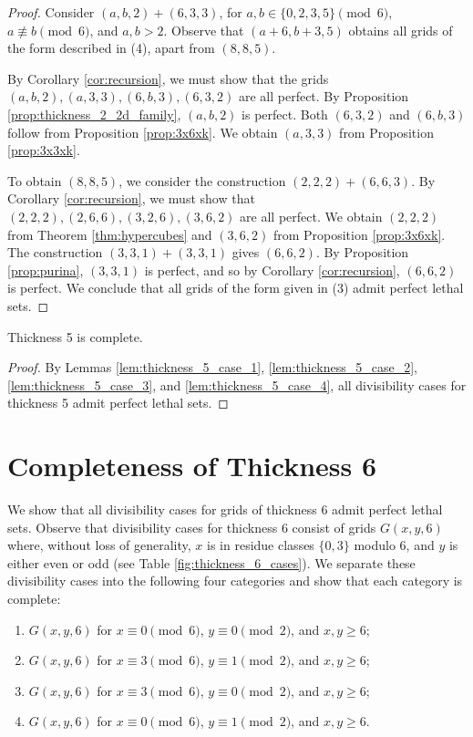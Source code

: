 \begin{proof}
Consider $(a,b,2) + (6,3,3)$, for $a,b \in \{0,2,3,5\} \pmod 6$, $a \not\equiv b \pmod 6$, and $a,b > 2$. Observe that $(a+6,b+3,5)$ obtains all grids of the form described in (4), apart from $(8,8,5)$.

By Corollary \ref{cor:recursion}, we must show that the grids $(a,b,2), (a,3,3), (6,b,3), (6,3,2)$ are all perfect. By Proposition \ref{prop:thickness_2_2d_family}, $(a,b,2)$ is perfect. Both $(6,3,2)$ and $(6,b,3)$ follow from Proposition \ref{prop:3x6xk}. We obtain $(a,3,3)$ from Proposition \ref{prop:3x3xk}.

To obtain $(8,8,5)$, we consider the construction $(2,2,2) + (6,6,3)$. By Corollary \ref{cor:recursion}, we must show that $(2,2,2), (2,6,6), (3,2,6), (3,6,2)$ are all perfect. We obtain $(2,2,2)$ from Theorem \ref{thm:hypercubes} and $(3,6,2)$ from Proposition \ref{prop:3x6xk}. The construction $(3,3,1)+(3,3,1)$ gives $(6,6,2)$. By Proposition \ref{prop:purina}, $(3,3,1)$ is perfect, and so by Corollary \ref{cor:recursion}, $(6,6,2)$ is perfect. We conclude that all grids of the form given in (3) admit perfect lethal sets.
\end{proof}

\begin{lem}
\label{lem:thickness_5_complete}
Thickness 5 is complete.
\end{lem}

\begin{proof}
By Lemmas \ref{lem:thickness_5_case_1}, \ref{lem:thickness_5_case_2}, \ref{lem:thickness_5_case_3}, and \ref{lem:thickness_5_case_4}, all divisibility cases for thickness 5 admit perfect lethal sets.
\end{proof}

\section{Completeness of Thickness 6}
We show that all divisibility cases for grids of thickness 6 admit perfect lethal sets. Observe that divisibility cases for thickness 6 consist of grids $G(x,y,6)$ where, without loss of generality, $x$ is in residue classes $\{0,3\}$ modulo 6, and $y$ is either even or odd (see Table \ref{fig:thickness_6_cases}). We separate these divisibility cases into the following four categories and show that each category is complete:

\begin{enumerate}
\item $G(x,y,6)$ for $x \equiv 0 \pmod 6$, $y \equiv 0 \pmod 2$, and $x,y \geq 6$;
\item $G(x,y,6)$ for $x \equiv 3 \pmod 6$, $y \equiv 1 \pmod 2$, and $x,y \geq 6$;
\item $G(x,y,6)$ for $x \equiv 3 \pmod 6$, $y \equiv 0 \pmod 2$, and $x,y \geq 6$;
\item $G(x,y,6)$ for $x \equiv 0 \pmod 6$, $y \equiv 1 \pmod 2$, and $x,y \geq 6$.
\end{enumerate}

